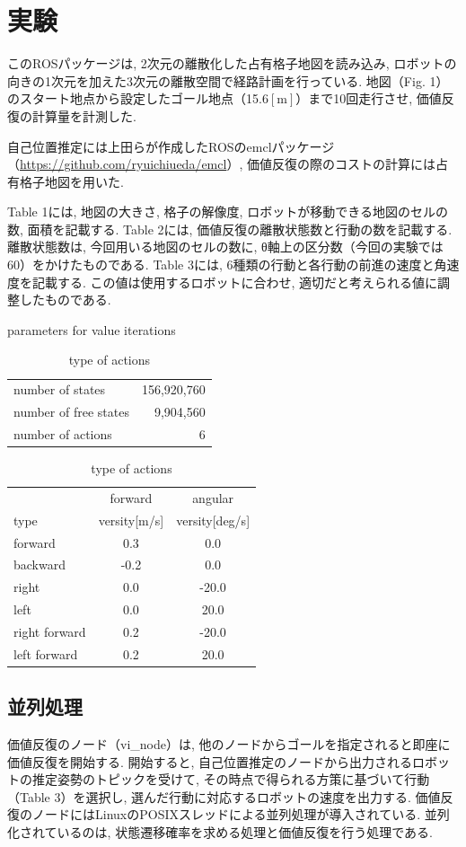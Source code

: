 \documentclass{jarticle}
\begin{document}
\section{実験}%

このROSパッケージ\cite{上田rsj2021}は, 2次元の離散化した占有格子地図を読み込み, 
ロボットの向きの1次元を加えた3次元の離散空間で経路計画を行っている.
地図（Fig. 1）のスタート地点から設定したゴール地点（15.6$\mathrm{[m]}$）まで10回走行させ, 価値反復の計算量を計測した.

自己位置推定には上田らが作成したROSのemclパッケージ（\href{https://github.com/ryuichiueda/emcl}{https://github.com/ryuichiueda/emcl}）\cite{Shinjuku5}, 価値反復の際のコストの計算には占有格子地図を用いた.

Table 1には, 地図の大きさ, 格子の解像度, ロボットが移動できる地図のセルの数, 面積を記載する.
Table 2には, 価値反復の離散状態数と行動の数を記載する.
離散状態数は, 今回用いる地図のセルの数に, θ軸上の区分数（今回の実験では60）をかけたものである.
Table 3には, 6種類の行動と各行動の前進の速度と角速度を記載する.
この値は使用するロボットに合わせ, 適切だと考えられる値に調整したものである.




\begin{table}[hbtp]
	\caption{parameters for value iterations}
  \centering
  \begin{tabular}{l|r}
    \hline
    number of states & 156,920,760\\
    number of free states &  9,904,560\\
		number of actions & 6\\
    \hline
  \end{tabular}
	\caption{type of actions}
	\centering
	\begin{tabular}{l|cc}
 		\hline
		& forward & angular \\
 		type & versity[m/s] & versity[deg/s] \\
 		\hline \hline
 		forward & 0.3 & 0.0 \\
 		backward & -0.2 & 0.0 \\
 		right & 0.0 & -20.0 \\
 		left & 0.0 & 20.0 \\
 		right forward & 0.2 & -20.0 \\
 		left forward & 0.2 & 20.0 \\
	 \hline
	\end{tabular}
\end{table}

\subsection{並列処理}
価値反復のノード（vi\_node）は, 他のノードからゴールを指定されると即座に価値反復を開始する.
開始すると, 自己位置推定のノードから出力されるロボットの推定姿勢のトピックを受けて, 
その時点で得られる方策に基づいて行動（Table 3）を選択し, 選んだ行動に対応するロボットの速度を出力する.
価値反復のノードにはLinuxのPOSIXスレッドによる並列処理が導入されている. 
並列化されているのは, 状態遷移確率を求める処理と価値反復を行う処理である.
\end{document}
